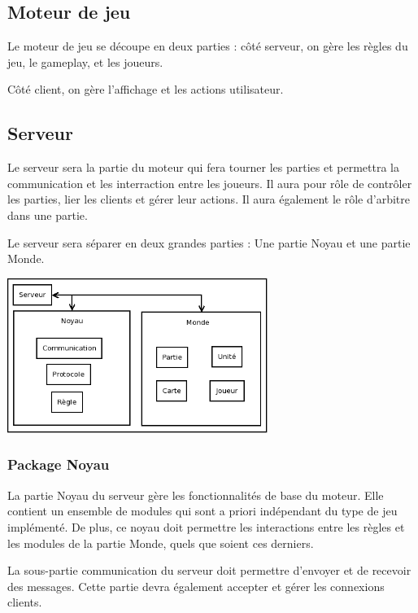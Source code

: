 \documentclass[a4paper,10pt]{report}
\begin{document}
      \subsection{Moteur de jeu}

        Le moteur de jeu se découpe en deux parties : côté serveur, on gère les règles du jeu, le gameplay, et les joueurs. 

        Côté client, on gère l'affichage et les actions utilisateur. 

      \subsection{Serveur}

        Le serveur sera la partie du moteur qui fera tourner les parties et permettra la communication et les interraction entre les joueurs. Il aura pour rôle de contrôler les parties, lier les clients et gérer leur actions. Il aura également le rôle d'arbitre dans une partie. 

        Le serveur sera séparer en deux grandes parties : Une partie Noyau et une partie Monde.

        \includegraphics[width=320px]{img/server-organisation.png}

        \subsubsection{Package Noyau}

          La partie Noyau du serveur gère les fonctionnalités de base du moteur. Elle contient un ensemble de modules qui sont a priori indépendant du type de jeu implémenté. De plus, ce noyau doit permettre les interactions entre les règles et les modules de la partie Monde, quels que soient ces derniers. 

          La sous-partie communication du serveur doit permettre d'envoyer et de recevoir des messages. Cette partie devra également accepter et gérer les connexions clients.
\end{document}
